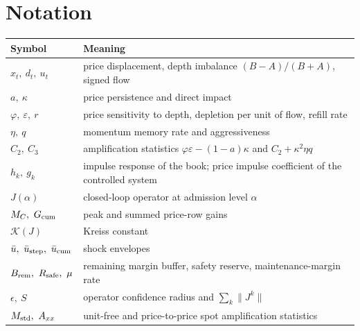 \documentclass[12pt]{article}
\theoremstyle{definition}
\theoremstyle{remark}
\begin{document}
\section{Notation}\label{app:notation}
\begin{longtable}{p{}p{}}
\toprule
Symbol & Meaning\\
\midrule
\endhead
$x_t,\ d_t,\ u_t$ & price displacement, depth imbalance $(B-A)/(B+A)$, signed flow\\
$a,\ \kappa$ & price persistence and direct impact\\
$\varphi,\ \varepsilon,\ r$ & price sensitivity to depth, depletion per unit of flow, refill rate\\
$\eta,\ q$ & momentum memory rate and aggressiveness\\
$C_2,\ C_3$ & amplification statistics $\varphi\varepsilon-(1-a)\kappa$ and $C_2+\kappa^2\eta q$\\
$h_k,\ g_k$ & impulse response of the book; price impulse coefficient of the controlled system\\
$J(\alpha)$ & closed-loop operator at admission level $\alpha$\\
$M_C,\ G_{\rm cum}$ & peak and summed price-row gains\\
$\mathcal K(J)$ & Kreiss constant\\
$\bar u,\ \bar u_{\rm step},\ \bar u_{\rm cum}$ & shock envelopes\\
$B_{\rm rem},\ R_{\rm safe},\ \mu$ & remaining margin buffer, safety reserve, maintenance-margin rate\\
$\epsilon,\ S$ & operator confidence radius and $\sum_k\|J^k\|$\\
$M_{\rm std},\ A_{xx}$ & unit-free and price-to-price spot amplification statistics\\
\bottomrule
\end{longtable}
\end{document}
